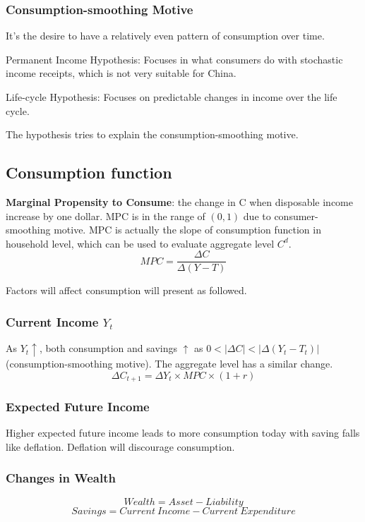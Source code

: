 \documentclass[10pt, a4paper]{article}
\begin{document}
            \subsubsection{Consumption-smoothing Motive}
                It's the desire to have a relatively even pattern of consumption over time. 

                Permanent Income Hypothesis: Focuses in what consumers do with stochastic income receipts, which is not very suitable for China. 

                Life-cycle Hypothesis: Focuses on predictable changes in income over the life cycle. 

                The hypothesis  tries to explain the consumption-smoothing motive. 

            
            \subsection{Consumption function}

                \textbf{Marginal Propensity to Consume}: the change in C when disposable income increase by one dollar. MPC is in the range of $(0, 1)$ due to consumer-smoothing motive. MPC is actually the slope of consumption function in household level, which can be used to evaluate aggregate level $C^d$.
                $$MPC = \frac{\Delta C}{\Delta (Y - T)}$$

                Factors will affect consumption will present as followed. 

                \subsubsection{Current Income $Y_t$}
                    As $Y_t \uparrow$, both consumption and savings $\uparrow$ as $0 < |\Delta C| < |\Delta (Y_t - T_t)|$ (consumption-smoothing motive).  The aggregate level has a similar change. 
                    $$\Delta C_{t + 1} = \Delta Y_t \times MPC \times (1 + r)$$

                \subsubsection{Expected Future Income}
                    Higher expected future income leads to more consumption today with saving falls like deflation.  Deflation will discourage consumption.  
                \subsubsection{Changes in Wealth}
                    $$Wealth = Asset - Liability$$
                    $$Savings = Current\ Income - Current\ Expenditure$$
\end{document}

